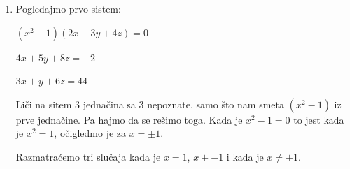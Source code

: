 \documentclass[a4paper,12pt]{report}
\begin{document}
\begin{enumerate}[1.]
\item Pogledajmo prvo sistem:
\begin{center}
\par $(x^{2} - 1)(2x -3y + 4z) = 0$
\par $4x + 5y +8z = -2$
\par $3x + y + 6z = 44$
\end{center}

\par Li\v{c}i na sitem 3 jedna\v{c}ina sa 3 nepoznate, samo \v{s}to nam smeta $(x^{2} - 1)$  iz prve jedna\v{c}ine. Pa hajmo da se re\v{s}imo toga. Kada je $x^{2} - 1 = 0$ to jest kada je $x^{2} =1$, o\v{c}igledmo je za $x = \pm 1$.
\par Razmatra\'{c}emo tri slu\v{c}aja kada je $x = 1$, $x+ -1$ i kada je $x \neq \pm 1$.
\begin{enumerate}[1)]


\end{enumerate}
\end{enumerate}
\end{document}
